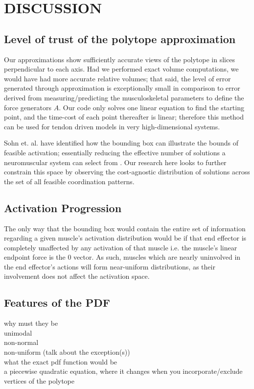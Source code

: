 \section{DISCUSSION}

\subsection{Level of trust of the polytope approximation} %
\label{sub:level_of_trust_of_the_polytope_approximation}

Our approximations show sufficiently accurate views of the polytope in slices perpendicular to each axis. Had we performed exact volume computations, we would have had more accurate relative volumes; that said, the level of error generated through approximation is exceptionally small in comparison to error derived from measuring/predicting the musculoskeletal parameters to define the force generators $A$. Our code only solves one linear equation to find the starting point, and the time-cost of each point thereafter is linear; therefore this method can be used for tendon driven models in very high-dimensional systems.

Sohn et. al. have identified how the bounding box can illustrate the bounds of feasible activation; essentially reducing the effective number of solutions a neuromuscular system can select from \cite{sohn2013cat_bounding_box}. Our research here looks to further constrain this space by observing the cost-agnostic distribution of solutions across the set of all feasible coordination patterns.

\subsection{Activation Progression} %
\label{sub:activation_progression}
The only way that the bounding box would contain the entire set of information regarding a given muscle's activation distribution would be if that end effector is completely unaffected by any activation of that muscle i.e. the muscle's linear endpoint force is the 0 vector. As such, muscles which are nearly uninvolved in the end effector's actions will form near-uniform distributions, as their involvement does not affect the activation space.

\subsection{Features of the PDF} %
\label{sub:features_of_the_pdf}
why must they be \\
unimodal\\
non-normal\\
non-uniform (talk about the exception(s))\\
what the exact pdf function would be \\
	a piecewise quadratic equation, where it changes when you incorporate/exclude vertices of the polytope

